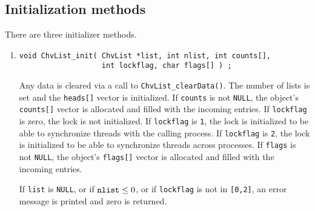 \subsection{Initialization methods}
\label{subsection:ChvList:proto:initial}
\par
There are three initializer methods.
\par
\begin{enumerate}
\item
\begin{verbatim}
void ChvList_init( ChvList *list, int nlist, int counts[], 
                   int lockflag, char flags[] ) ;
\end{verbatim}
Any data is cleared via a call to
{\tt ChvList\_clearData()}.
The number of lists is set and the {\tt heads[]} vector is
initialized.
If {\tt counts} is not {\tt NULL}, the object's {\tt counts[]}
vector is allocated and filled with the incoming entries.
If {\tt lockflag} is zero, the lock is not initialized.
If {\tt lockflag} is {\tt 1}, the lock is initialized
to be able to synchronize threads with the calling process.
If {\tt lockflag} is {\tt 2}, the lock is initialized
to be able to synchronize threads across processes.
If {\tt flags} is not {\tt NULL}, the object's {\tt flags[]}
vector is allocated and filled with the incoming entries.
\par {}
If {\tt list} is {\tt NULL},
or if ${\tt nlist} \le 0$,
or if {\tt lockflag} is not in {\tt [0,2]},
an error message is printed and zero is returned.
\end{enumerate}
\par
